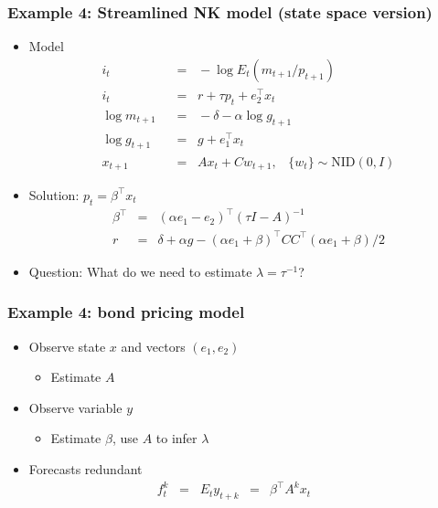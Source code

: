 \documentclass{beamer}
\begin{document}
\begin{frame}
\frametitle{Example 4: Streamlined NK model (state space version)}
\begin{itemize} \itemsep=\bigskipamount
\item Model
\begin{align*}
    i_t &\;\;=\;\;  - \log E_t \left( m_{t+1} / p_{t+1} \right)  \tag{Euler equation} \\
    i_t &\;\;=\;\;  r + \tau p_{t} +  e_2^\top x_{t} \tag{Taylor rule} \\
    \log m_{t+1} &\;\;=\;\; - \delta - \alpha \log g_{t+1} \\
    \log g_{t+1} &\;\;=\;\; g + e_1^\top x_t \\
    x_{t+1} &\;\;=\;\; A x_{t} + C w_{t+1},
            \;\;\;\{ w_t \} \sim \mbox{NID}(0,I)
\end{align*}
\item Solution:  $ p_t = \beta^\top x_t $ 
\begin{eqnarray*}
    \beta^\top &=& (\alpha e_1 - e_2)^\top (\tau I - A)^{-1} \\
    r &=& \delta + \alpha g - (\alpha e_1 + \beta)^\top C C^\top (\alpha e_1 + \beta)/2 
\end{eqnarray*}

\item Question:  What do we need to estimate $\lambda = \tau^{-1}$?
\end{itemize}
\end{frame}

\begin{frame}
\frametitle{Example 4: bond pricing model}
\begin{itemize}  \itemsep=\bigskipamount
\item Observe state $x$ and vectors $(e_1,e_2)$\\
\begin{itemize}
\item Estimate $A$ \;
\end{itemize}
\item Observe variable $y$ \\
\begin{itemize}
\item Estimate $\beta$, use $A$ to infer $\lambda$
\end{itemize}
\item Forecasts redundant
\begin{eqnarray*}
    f^k_t \;\;=\;\; E_t y_{t+k} &=& \beta^\top A^k x_t \phantom{xxxx}
\end{eqnarray*}
\end{itemize}
\end{frame}
\end{document}
